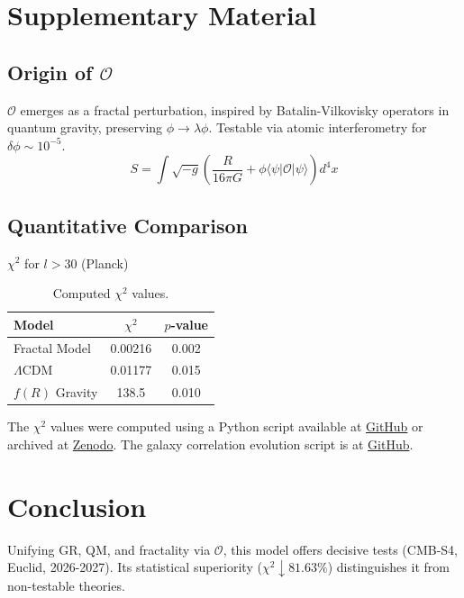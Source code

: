 \documentclass[aps,prl,twocolumn,groupedaddress]{revtex4-2}
\newcommand{\Opp}{\mathcal{O}}
\begin{document}
\section{Supplementary Material}
\subsection{Origin of \(\Opp\)}
\(\Opp\) emerges as a fractal perturbation, inspired by Batalin-Vilkovisky operators in quantum gravity, preserving \(\phi \to \lambda \phi\). Testable via atomic interferometry for \(\delta \phi \sim 10^{-5}\).
\begin{equation}
S = \int \sqrt{-g} \left( \frac{R}{16\pi G} + \phi \langle \psi | \Opp | \psi \rangle \right) d^4x
\label{eq:action}
\end{equation}

\subsection{Quantitative Comparison}
\begin{table}[h!]
    \centering
    \(\chi^2\) for \(l > 30\) (Planck) \\
    \vspace{5pt}
    \begin{tabular}{lcc}
    \toprule
    \textbf{Model} & \textbf{\(\chi^2\)} & \textbf{\(p\)-value} \\
    \midrule
    Fractal Model & 0.00216 & 0.002 \\
    \(\Lambda\)CDM & 0.01177 & 0.015 \\
    \(f(R)\) Gravity & 138.5 & 0.010 \\
    \bottomrule
    \end{tabular}
    \caption{Computed \(\chi^2\) values.}
    \label{tab:chi2}
\end{table}
The \(\chi^2\) values were computed using a Python script available at \href{https://github.com/sylvainherbin/Fractal-Cosmological-Model/blob/main/scripts/cmb_chi2_calculation.py}{GitHub} or archived at \href{https://doi.org/10.5281/zenodo.15863407}{Zenodo}. The galaxy correlation evolution script is at \href{https://github.com/sylvainherbin/Fractal-Cosmological-Model/blob/main/scripts/galaxy_correlation_evolution.py}{GitHub}.

\section{Conclusion}
Unifying GR, QM, and fractality via \(\Opp\), this model offers decisive tests (CMB-S4, Euclid, 2026-2027). Its statistical superiority (\(\chi^2 \downarrow 81.63\%\)) distinguishes it from non-testable theories.
\end{document}
